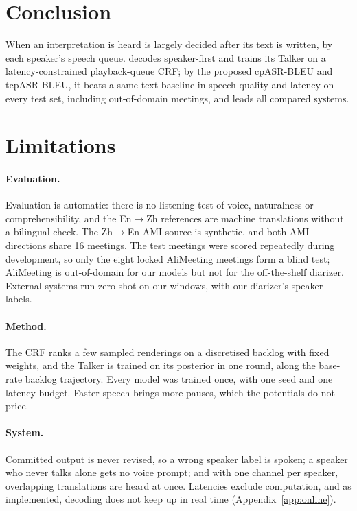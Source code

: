 \section{Conclusion}
\label{sec:conclusion}

When an interpretation is heard is largely decided after its text is written, by each speaker's speech queue.
\sys{} decodes speaker-first and trains its Talker on a latency-constrained playback-queue CRF; by the proposed
cpASR-BLEU and tcpASR-BLEU, it beats a same-text baseline in speech quality and latency on every test set,
including out-of-domain meetings, and leads all compared systems.

\section*{Limitations}
\label{sec:res-hygiene}

\paragraph{Evaluation.} Evaluation is automatic: there is no listening test of voice, naturalness or
comprehensibility, and the En$\rightarrow$Zh references are machine translations without a bilingual check. The
Zh$\rightarrow$En AMI source is synthetic, and both AMI directions share 16 meetings. The test meetings were scored
repeatedly during development, so only the eight locked AliMeeting meetings form a blind test; AliMeeting is
out-of-domain for our models but not for the off-the-shelf diarizer. External systems run zero-shot on our windows,
with our diarizer's speaker labels.

\paragraph{Method.} The CRF ranks a few sampled renderings on a discretised backlog with fixed weights, and the Talker
is trained on its posterior in one round, along the base-rate backlog trajectory. Every model was trained once, with
one seed and one latency budget. Faster speech brings more pauses, which the potentials do not price.

\paragraph{System.} Committed output is never revised, so a wrong speaker label is spoken; a speaker who never talks
alone gets no voice prompt; and with one channel per speaker, overlapping translations are heard at once. Latencies
exclude computation, and as implemented, decoding does not keep up in real time (Appendix~\ref{app:online}).

